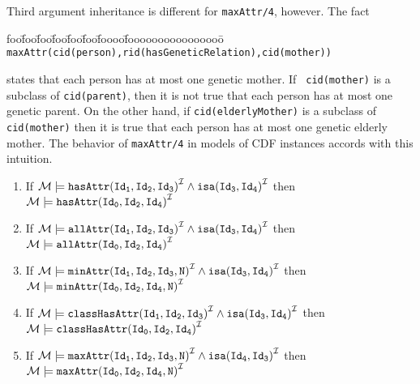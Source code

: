 Third argument inheritance is different for {\tt maxAttr/4}, however.
The fact
{\small 
\begin{tabbing}
foo\=foo\=foo\=foo\=foo\=foo\=foooo\=foooooooooooooooo\=\kill
\> 
{\tt maxAttr(cid(person),rid(hasGeneticRelation),cid(mother))}
\end{tabbing} }
\noindent
states that each person has at most one genetic mother.  If {\tt
cid(mother)} is a subclass of {\tt cid(parent)}, then it is not true
that each person has at most one genetic parent.  On the other hand,
if {\tt cid(elderlyMother)} is a subclass of {\tt cid(mother)} then it
is true that each person has at most one genetic elderly mother.  The
behavior of {\tt maxAttr/4} in models of CDF instances accords with
this intuition.

\begin{proposition} \rm
\label{prop:inh3} 
\end{proposition} 
\begin{enumerate}
\item If ${\cal M} \models {\tt hasAttr(Id_1,Id_2,Id_3)}^{{\cal I}} \wedge
					{\tt isa(Id_3,Id_4)}^{{\cal I}}$
					then ${\cal M} \models {\tt
					hasAttr(Id_0,Id_2,Id_4)}^{{\cal I}}
					$
%
\item If ${\cal M} \models {\tt allAttr(Id_1,Id_2,Id_3)}^{{\cal I}} \wedge
					{\tt isa(Id_3,Id_4)}^{{\cal I}}$ 
	then ${\cal M} \models {\tt allAttr(Id_0,Id_2,Id_4)}^{{\cal I}} $ 
%
\item If ${\cal M} \models {\tt minAttr(Id_1,Id_2,Id_3,N)}^{{\cal I}} \wedge
					{\tt isa(Id_3,Id_4)}^{{\cal I}}$ 
	then ${\cal M} \models {\tt minAttr(Id_0,Id_2,Id_4,N)}^{{\cal I}} $ 
%
\item If ${\cal M} \models {\tt classHasAttr(Id_1,Id_2,Id_3)}^{{\cal I}} \wedge
			  {\tt isa(Id_3,Id_4)}^{{\cal I}}$ 
	then ${\cal M} \models {\tt classHasAttr(Id_0,Id_2,Id_4)}^{{\cal I}} $ 
%
\item If ${\cal M} \models {\tt maxAttr(Id_1,Id_2,Id_3,N)}^{{\cal I}} \wedge
			  {\tt isa(Id_4,Id_3)}^{{\cal I}}$ 
	then ${\cal M} \models {\tt maxAttr(Id_0,Id_2,Id_4,N)}^{{\cal I}} $ 

\end{enumerate}


